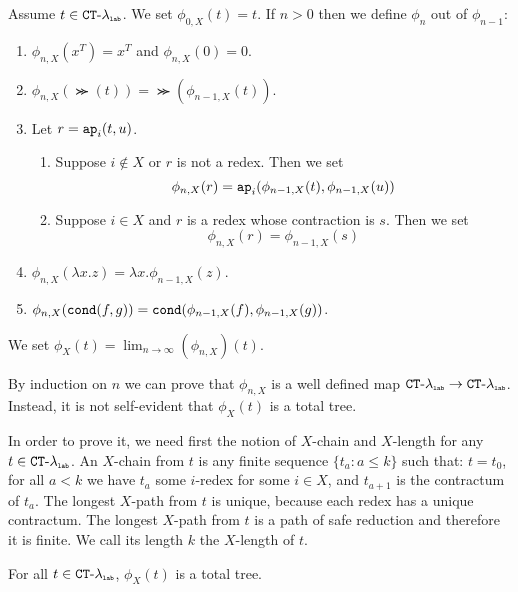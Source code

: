 \begin{definition}
Assume $t \in { { {\tt CT} \mbox{-} \lambda} _ {\mbox{\tiny \tt lab}} }$.
We set $\phi_{0,X}(t)=t$. If $n >0$ then we define $\phi_n$ out of $\phi_{n-1}$:
\begin{enumerate} 

\item
$\phi_{n,X}(x^T)=x^T$ and $\phi_{n,X}(0)=0$.

\item
$\phi_{n,X}(\Succ(t)) = \Succ(\phi_{n-1,X}(t))$. 

\item
Let $r = {\tt ap}_i(t,u)$. 
\begin{enumerate} 
\item
Suppose $i \not \in X$ or $r$ is not a redex. Then we set
$$\phi_{n,X}(r) = {\tt ap}_i(\phi_{n-1,X}(t),\phi_{n-1,X}(u))$$
\item
Suppose $i \in X$ and $r$ is a redex whose contraction is $s$. Then we set
$$\phi_{n,X}(r) = \phi_{n-1,X}(s)$$
\end{enumerate}

\item
$\phi_{n,X}(\lambda x.z) = \lambda x.\phi_{n-1,X}(z)$.

\item
$\phi_{n,X}({\tt cond}(f,g)) = {\tt cond}(\phi_{n-1,X}(f), \phi_{n-1,X}(g))$.

\end{enumerate}

We set $\phi_X(t) = \lim_{n \rightarrow \infty}(\phi_{n,X})(t)$.
\end{definition}


By induction on $n$ we can prove that 
$\phi_{n,X}$ is a well defined map ${{ {\tt CT} \mbox{-} \lambda}_{\mbox{\tiny \tt lab}}} \rightarrow { { {\tt CT} \mbox{-} \lambda} _ {\mbox{\tiny \tt lab}} }$.
Instead, it is not self-evident that $\phi_X(t)$ is a total tree.

In order to prove it, we need first the notion of $X$-chain and $X$-length for any $t \in { { {\tt CT} \mbox{-} \lambda} _ {\mbox{\tiny \tt lab}} }$.
An $X$-chain from $t$ is any finite sequence $\{t_a : a \le k\}$ such that: 
$t=t_0$, for all $a<k$ we have $t_a$ some $i$-redex for some $ i \in X$, and $t_{a+1}$ is the contractum
of $t_a$. The longest $X$-path from $t$ is unique, because each redex has a unique contractum. 
The longest $X$-path from $t$ is a path of safe reduction and therefore it is finite. We call its length $k$ the
$X$-length of $t$.

\begin{lemma}
For all $t \in { { {\tt CT} \mbox{-} \lambda} _ {\mbox{\tiny \tt lab}} }$, $\phi_X(t)$ is a total tree.
\end{lemma}


